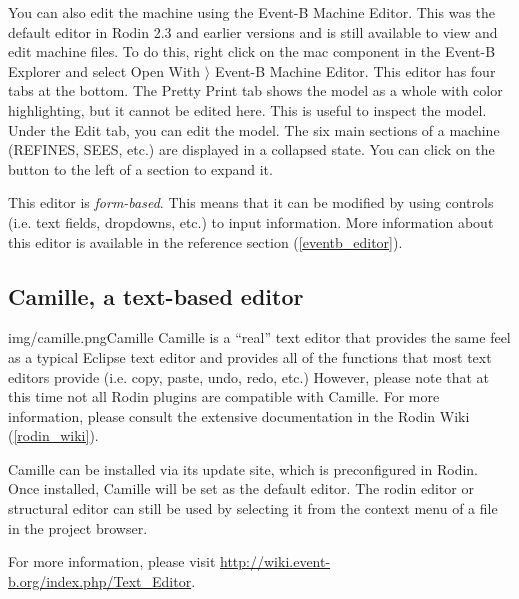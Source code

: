 You can also edit the machine using the Event-B Machine Editor. This was the default editor in Rodin 2.3 and earlier versions and is still available to view and edit machine files. To do this, right click on the \textsf{mac} component in the Event-B Explorer and select \textsf{Open With $\rangle$ Event-B Machine Editor}. This editor has four tabs at the bottom.  The \textsf{Pretty Print} tab shows the model as a whole with color highlighting, but it cannot be edited here.  This is useful to inspect the model. Under the \textsf{Edit} tab, you can edit the model.  The six main sections of a machine (REFINES, SEES, etc.) are displayed in a collapsed state.  You can click on the  button to the left of a section to expand it.


This editor is \textit{form-based}.  This means that it can be modified by using controls (i.e. text fields, dropdowns, etc.) to input information. More information about this editor is available in the reference section (\ref{eventb_editor}).


\subsection{Camille, a text-based editor}
\label{tut_camille}

\begin{rodin-plugin}{img/camille.png}{Camille}
Camille is a ``real'' text editor that provides the same feel as a typical Eclipse text editor and provides all of the functions that most text editors provide (i.e. copy, paste, undo, redo, etc.)  However, please note that at this time not all Rodin plugins are compatible with Camille.  For more information, please consult the extensive documentation in the Rodin Wiki (\ref{rodin_wiki}).

Camille can be installed via its update site, which is preconfigured in Rodin.  Once installed, Camille will be set as the default editor.  The rodin editor or structural editor can still be used by selecting it from the context menu of a file in the project browser.

For more information, please visit \url{http://wiki.event-b.org/index.php/Text_Editor}.


\end{rodin-plugin}

